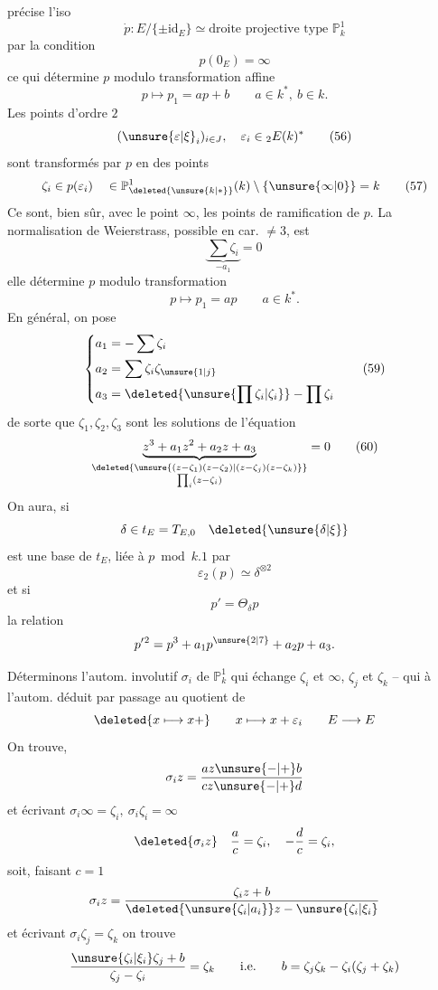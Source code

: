 précise l'iso
\[
\dot p:E/\{\pm\mathrm{id}_E\}\simeq\text{droite projective type }\mathbb{P}^1_k\tag*{(53)}
\]
par la condition
\[
p(0_E)=\infty\tag*{(54)}
\]
ce qui détermine $p$ modulo transformation affine
\[
p\longmapsto p_1=ap+b\qquad a\in k^*,\ b\in k.\tag*{(55)}
\]
Les points d'ordre $2$
\[
(\unsure{\varepsilon|\xi}_i)_{i\in J},\quad \varepsilon_i\in{}_{2}E(k)^*\tag*{(56)}
\]
sont transformés par $p$ en des points
\[
\zeta_i\in p(\varepsilon_i)\quad\in\mathbb{P}^1_{\deleted{\unsure{k|*}}}(k)\setminus\{\unsure{\infty|0}\}=k\tag*{(57)}
\]
Ce sont, bien sûr, avec le point $\infty$, les points de ramification de $p$. La normalisation de Weierstrass, possible en car. $\ne3$,  est
\[
\underbrace{\sum\zeta_i}_{-a_1}=0\tag*{(58)}
\]
elle détermine $p$ modulo transformation
\[
p\longmapsto p_1=ap\qquad a\in k^*.
\]
En général, on pose
\[
\left\{\begin{aligned}
a_1&=-\sum\zeta_i\\
a_2&=\sum\zeta_i\zeta_{\unsure{1|j}}\\
a_3&=\deleted{\unsure{\prod\zeta_i|\zeta_i}}-\prod\zeta_i
\end{aligned}\right.\tag*{(59)}
\]
de sorte que $\zeta_1,\zeta_2,\zeta_3$ sont les solutions de l'équation
\[
\underbrace{z^3+a_1z^2+a_2z+a_3}_{\substack{\deleted{\unsure{(z-\zeta_1)(z-\zeta_2)|(z-\zeta_j)(z-\zeta_k)}}\\\prod_i(z-\zeta_i)}}=0\tag*{(60)}
\]
On aura,  si
\[
\delta\in t_E=T_{E,0}\quad\deleted{\unsure{\delta|\xi}}
\]
est une base de $t_E$, liée à $p\bmod k.1$ par
\[
\varepsilon_2(p)\simeq\delta^{\otimes2}
\]
et si
\[
p'=\Theta_\delta p
\]
la relation
\[
p'{}^2=p^3+a_1p^{\unsure{2|7}}+a_2p+a_3.
\]

Déterminons l'autom. involutif $\sigma_i$ de $\mathbb{P}^1_k$ qui échange $\zeta_i$ et $\infty$, $\zeta_j$ et $\zeta_k$ -- qui  à l'autom. déduit par passage au quotient de
\[
\deleted{x\longmapsto x+}\qquad x\longmapsto x+\varepsilon_i\qquad E\longrightarrow E
\]
On trouve, 
\[
\sigma_i z=\frac{az\unsure{-|+}b}{cz\unsure{-|+}d}
\]
et écrivant $\sigma_i\infty=\zeta_i,\ \sigma_i\zeta_i=\infty$
\[
\deleted{\sigma_i z}\quad\frac ac=\zeta_i,\quad-\frac dc=\zeta_i,
\]
soit, faisant $c=1$
\[
\sigma_i z=\frac{\zeta_i z+b}{\deleted{\unsure{\zeta_i|a_i}}z-\unsure{\zeta_i|\xi_i}}
\]
et écrivant $\sigma_i\zeta_j=\zeta_k$ on trouve
\[
\frac{\unsure{\zeta_i|\xi_i}\zeta_j+b}{\zeta_j-\zeta_i}=\zeta_k\qquad\text{i.e.}\qquad b=\zeta_j\zeta_k-\zeta_i(\zeta_j+\zeta_k)
\]
